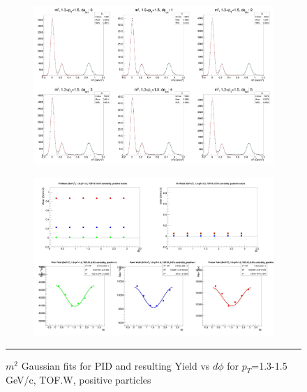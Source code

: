 \begin{figure}[H]
  \centering
    \begin{subfigure}[p]{1\textwidth}
    \includegraphics[width=1\textwidth]{lowptfits/yieldvsdphi_tof1_cent0_ch1_pT-13-15.jpg}
    \end{subfigure}
    \begin{subfigure}[p]{1\textwidth}
    \includegraphics[width=1\textwidth]{lowptfits/fitParams_tof1_cent0_ch1_pT-13-15.jpg}
    \end{subfigure}
    \rule{35em}{0.5pt}
  \caption[PID fits and Yield vs $d\phi$ for $p_T$=1.3-1.5 GeV/c, TOF.W, positive particles ]{$m^2$ Gaussian fits for PID and resulting Yield vs $d\phi$ for $p_T$=1.3-1.5 GeV/c, TOF.W, positive particles}
  \label{fig:fits13-15pos}
\end{figure}

